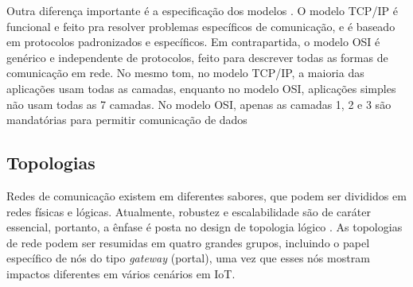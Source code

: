 \documentclass[tcc,capa]{texufpel}
\begin{document}
Outra diferença importante é a especificação dos modelos \cite{imperva}. O modelo TCP/IP é funcional e feito pra resolver problemas específicos de comunicação, e é baseado em protocolos padronizados e específicos. Em contrapartida, o modelo OSI é genérico e independente de protocolos, feito para descrever todas as formas de comunicação em rede. No mesmo tom, no modelo TCP/IP, a maioria das aplicações usam todas as camadas, enquanto no modelo OSI, aplicações simples não usam todas as 7 camadas. No modelo OSI, apenas as camadas 1, 2 e 3 são mandatórias para permitir comunicação de dados

\subsection{Topologias}
Redes de comunicação existem em diferentes sabores, que podem ser divididos em redes físicas e lógicas. Atualmente, robustez e escalabilidade são de caráter essencial, portanto, a ênfase é posta no design de topologia lógico \cite{schiller}. As topologias de rede podem ser resumidas em quatro grandes grupos, incluindo o papel específico de nós do tipo \textit{gateway} (portal), uma vez que esses nós mostram impactos diferentes em vários cenários em IoT.
\end{document}
